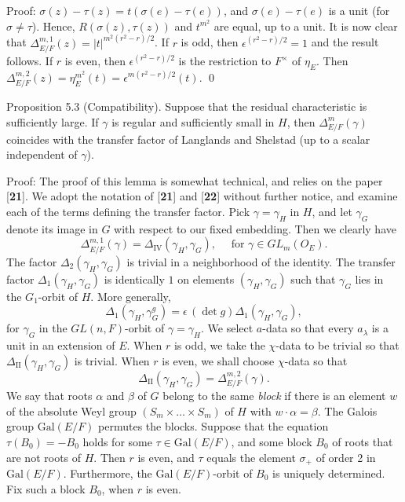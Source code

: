 \pproclaim Proof:
  $\sigma (z)- \tau (z) = t (\sigma(e)-\tau(e))$,
  and $\sigma(e)-\tau(e)$ is a unit (for $\sigma\ne\tau$).
Hence,
$R(\sigma(z),\tau(z))$ and $t^{m^2}$ are equal, up
to a unit.
%
It is now clear that
  $ \Delta_{E/F}^{m,1} (z) =
    | t|^{ m^2 (r^2-r)/2 } $.
If $r$ is odd, then
  $ \epsilon^{(r^2-r)/2} = 1 $
and the result follows.
If $r$ is even, then
  $ \epsilon^{(r^2-r)/2} $
is the restriction to
  $ F^{\times} $ 
of
  $ \eta_E $.
Then
  $ \Delta_{E/F}^{m,2} (z) =
    \eta_E^{m^2} (t) =
    \epsilon^{ m (r^2-r)/2 } (t) $.
\qed
\finishpproclaim 



\bigskip
\proclaim Proposition {5.3} (Compatibility).
Suppose that the residual characteristic is sufficiently large.
If $ \gamma $ is regular and sufficiently small in
  $ H$, then 
$\Delta^m_{E/F}(\gamma)$ coincides with the transfer factor of Langlands
and Shelstad (up to a scalar independent of $\gamma$).
\finishproclaim

\pproclaim Proof:
The proof of this lemma is somewhat technical, and relies on the paper [{\bf 21}].
We adopt the notation of [{\bf 21}] and [{\bf 22}] without further notice, 
and examine each of the terms defining the transfer factor.
%
Pick
  $ \gamma = \gamma_H $
in $H$, and let
  $ \gamma_G $
denote its image in $G$ with respect to our fixed embedding.
Then we clearly have
%
$$
  \Delta_{E/F}^{m,1} (\gamma) =
  \Delta_{\text{IV}}
  (\gamma_H, \gamma_G),\quad \text{ for }
  \gamma \in GL_m (O_E).
$$
%
The factor
  $ \Delta_2 (\gamma_H, \gamma_G) $
is trivial in a neighborhood of the identity. 
The transfer factor 
  $ \Delta_1 (\gamma_H, \gamma_G) $ is identically $1$
on elements
  $ (\gamma_H, \gamma_G ) $
such that
  $ \gamma_G $ 
lies in the 
  $G_1$-orbit of $H$.
More generally,
%
$$
  \Delta_1
  (\gamma_H, \gamma_G^g) =
  \epsilon \,(\det g) \Delta_1 (\gamma_H, \gamma_G),
$$
%
for $ \gamma_G $ in the $GL(n,F)$-orbit of $ \gamma= \gamma_H $.
We select $a$-data so that every 
  $ a_{\lambda} $
is a unit in an extension of $E$.
When $r$ is odd, we take the
  $ \chi $-data to be trivial so that
  $ \Delta_{\text{II}}
    (\gamma_H, \gamma_G) $
is trivial.
When $r$ is even,
we shall choose
  $ \chi $-data so that
%
$$
  \Delta_{\text{II}} (\gamma_H, \gamma_G) =
  \Delta_{E/F}^{m,2} (\gamma) .
$$
%
We say that roots $\alpha$ and $\beta$ of $G$ belong
to the same {\it block} if there is an element $w$ of
the absolute Weyl group $(S_m\times\ldots\times S_m)$
of $H$ with $w\cdot \alpha=\beta$. The Galois group
$\text{Gal}(E/F)$ permutes the blocks.  
Suppose that the equation $\tau(B_0) = -B_0$ holds for
some $\tau\in \text{Gal}(E/F)$, and some block $B_0$ of roots
that are not roots of $H$.  Then $r$ is even,
and $\tau$ equals the element $\sigma_+$ of order 2 in $\text{Gal}(E/F)$.
Furthermore, the $\text{Gal}(E/F)$-orbit of $B_0$ is uniquely determined.
Fix such a block $B_0$, when $r$ is even.


